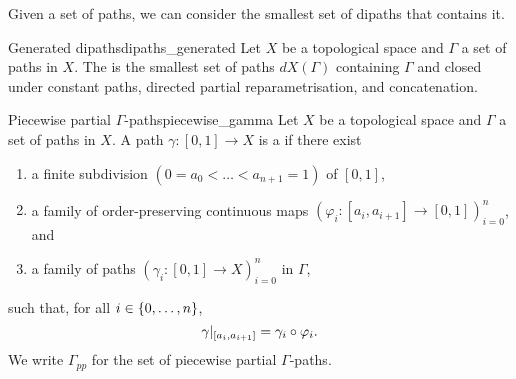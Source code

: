 Given a set of paths, we can consider the smallest set of dipaths that contains it.

\begin{cdef}{Generated dipaths}{dipaths_generated}
	Let \( X \) be a topological space and \( \Gamma \) a set of paths in \( X \).
	The  is the smallest set of paths \( dX(\Gamma) \) containing \( \Gamma \) and closed under constant paths, directed partial reparametrisation, and concatenation.
\end{cdef}

\begin{cdef}{Piecewise partial \( \Gamma \)-paths}{piecewise_gamma}
	Let \( X \) be a topological space and \( \Gamma \) a set of paths in \( X \).
	A path \( \gamma\colon [0, 1] \to X \) is a  if there exist
	\begin{enumerate}
		\item a finite subdivision \( (0 = a_0 < \ldots < a_{n+1} = 1) \) of \( [0, 1] \),
		\item a family of order-preserving continuous maps \( (\varphi_i\colon [a_i, a_{i+1}] \to [0, 1])_{i=0}^n \), and
		\item a family of paths \( (\gamma_i\colon [0, 1] \to X)_{i=0}^n \) in \( \Gamma \),
	\end{enumerate}
	such that, for all \( i \in \{0, \dots, n\} \), 
	\begin{equation*}
		\restr{\gamma}{[a_i, a_{i+1}]} = \gamma_i \circ \varphi_i.
	\end{equation*}
	We write \( \Gamma_\textit{pp} \) for the set of piecewise partial \( \Gamma \)-paths.
\end{cdef}

